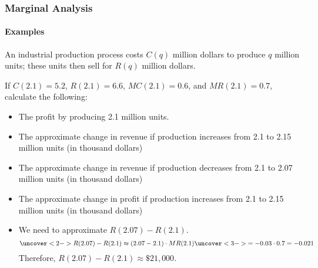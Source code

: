 \documentclass[9pt,xcolor=x11names,compress]{beamer}
\begin{document}
\begin{frame}\frametitle{Marginal Analysis}
\framesubtitle{Examples}
\begin{example}
	An industrial production process costs $C(q)$ million dollars to produce $q$ million units; these units then sell for $R(q)$ million dollars.

	If $C(2.1)=5.2$, $R(2.1)=6.6$, $MC(2.1)=0.6$, and $MR(2.1)=0.7$, calculate the following:
	\begin{itemize}
		\item The profit by producing 2.1 million units.
		\item The approximate change in revenue if production increases from 2.1 to 2.15 million units (in thousand dollars)
		\item \alert{The approximate change in revenue if production decreases from 2.1 to 2.07 million units (in thousand dollars)}
		\item The approximate change in profit if production increases from 2.1 to 2.15 million units (in thousand dollars)
	\end{itemize}
\end{example}
\begin{itemize}
	\item We need to approximate $R(2.07)-R(2.1)$.
	\begin{equation*}
	     \uncover<2->{R(2.07) - R(2.1) \approx (2.07-2.1)\cdot MR(2.1)}\uncover<3->{=-0.03 \cdot 0.7=-0.021}
     \end{equation*}
     \pause\pause\pause Therefore, $R(2.07)-R(2.1)\approx \$21,000.$
\end{itemize}
\end{frame}
\end{document}
